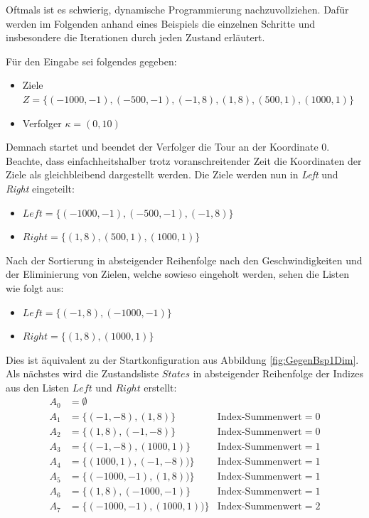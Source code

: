 \documentclass[german,version-2019-11]{uzl-thesis}
\begin{document}
Oftmals ist es schwierig, dynamische Programmierung nachzuvollziehen. Dafür werden im Folgenden anhand eines Beispiels die einzelnen Schritte und insbesondere die Iterationen durch jeden Zustand erläutert.
\begin{example}
\label{example:1D}
Für den Eingabe sei folgendes gegeben:
\begin{itemize}
\item Ziele $Z=\{(-1000,-1),(-500,-1),(-1,8),(1,8),(500,1),(1000,1)\}$
\item Verfolger $\kappa=(0,10)$
\end{itemize}
Demnach startet und beendet der Verfolger die Tour an der Koordinate $0$. Beachte, dass einfachheitshalber trotz voranschreitender Zeit die Koordinaten der Ziele als gleichbleibend dargestellt werden. Die Ziele werden nun in \emph{Left} und \emph{Right} eingeteilt:
\begin{itemize}
\item $Left=\{(-1000,-1),(-500,-1),(-1,8)\}$ 
\item $Right=\{(1,8),(500,1),(1000,1)\}$
\end{itemize}
Nach der Sortierung in absteigender Reihenfolge nach den Geschwindigkeiten und der Eliminierung von Zielen, welche sowieso eingeholt werden, sehen die Listen wie folgt aus:
\begin{itemize}
\item $Left=\{(-1,8),(-1000,-1)\}$ 
\item $Right=\{(1,8),(1000,1)\}$
\end{itemize}
Dies ist äquivalent zu der Startkonfiguration aus Abbildung \ref{fig:GegenBsp1Dim}. Als nächstes wird die Zustandsliste $States$ in absteigender Reihenfolge der Indizes aus den Listen $Left$ und $Right$ erstellt:
\begin{align*}
A_0&=\emptyset\\
A_1&=\{(-1, -8), (1, 8)\} &\text{Index-Summenwert}=0\\
A_2&=\{(1, 8), (-1, -8)\} &\text{Index-Summenwert}=0\\ 
A_3&=\{(-1, -8), (1000, 1)\} &\text{Index-Summenwert}=1\\
A_4&=\{(1000, 1), (-1, -8))\} &\text{Index-Summenwert}=1\\
A_5&=\{(-1000, -1), (1, 8))\} &\text{Index-Summenwert}=1\\
A_6&=\{(1, 8), (-1000, -1)\} &\text{Index-Summenwert}=1\\
A_7&=\{(-1000, -1), (1000, 1))\} &\text{Index-Summenwert}=2\\

\end{align*}
\end{example}
\end{document}
